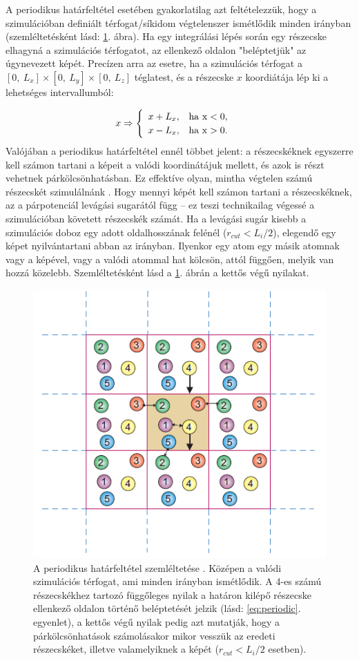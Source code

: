 \documentclass[12pt]{article}
\theoremstyle{plain}
\begin{document}
A periodikus határfeltétel esetében gyakorlatilag azt feltételezzük, hogy a szimulációban definiált térfogat/síkidom végtelenszer ismétlődik minden irányban (szemléltetésként lásd: \ref{fig:periodicboundary}. ábra). Ha egy integrálási lépés során egy részecske elhagyná a szimulációs térfogatot, az ellenkező oldalon "beléptetjük" az úgynevezett képét. Precízen arra az esetre, ha a szimulációs térfogat a $[0, ~L_x] \times [0, ~L_y] \times [0, ~L_z]$ téglatest, és a részecske $x$ koordiátája lép ki a lehetséges intervallumból:

\begin{equation}
	x \Rightarrow \begin{cases}
	\begin{array}{lr}
	x + L_x, & \rm{ha} ~x<0, \\
	x - L_x, & \rm{ha} ~x>0.
	\end{array}
	\end{cases}
	\label{eq:periodic}
\end{equation}
Valójában a periodikus határfeltétel ennél többet jelent: a részecskéknek egyszerre kell számon tartani a képeit a valódi koordinátájuk mellett, és azok is részt vehetnek párkölcsönhatásban. Ez effektíve olyan, mintha végtelen számú részecskét szimulálnánk \cite{Landau2012}. Hogy mennyi képét kell számon tartani a részecskéknek, az a párpotenciál levágási sugarától függ -- ez teszi technikailag végessé a szimulációban követett részecskék számát. Ha a levágási sugár kisebb a szimulációs doboz egy adott oldalhosszának felénél ($r_{cut} < L_i/2$), elegendő egy képet nyilvántartani abban az irányban. Ilyenkor egy atom egy másik atomnak vagy a képével, vagy a valódi atommal hat kölcsön, attól függően, melyik van hozzá közelebb. Szemléltetésként lásd a \ref{fig:periodicboundary}. ábrán a kettős végű nyilakat. 


\begin{figure}
	\centering
	\includegraphics[width=0.5\linewidth]{media/periodic_boundary}
	\caption{A periodikus határfeltétel szemléltetése \cite{Landau2012}. Középen a valódi szimulációs térfogat, ami minden irányban ismétlődik. A 4-es számú részecskékhez tartozó függőleges nyilak a határon kilépő részecske ellenkező oldalon történő beléptetését jelzik (lásd: \ref{eq:periodic}. egyenlet), a kettős végű nyilak pedig azt mutatják, hogy a párkölcsönhatások számolásakor mikor vesszük az eredeti részecskéket, illetve valamelyiknek a képét ($r_{cut} < L_i/2$ esetben).}
	\label{fig:periodicboundary}
\end{figure}
\end{document}
